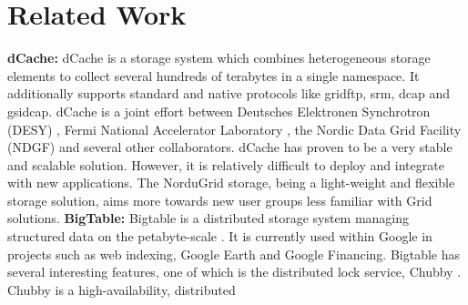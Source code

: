 \documentclass[final]{ieee}
\begin{document}
\section{Related Work}
\label{Related Work}
\textbf{dCache:} dCache is a storage system which combines heterogeneous storage
elements to collect several hundreds of terabytes in a single
namespace. It additionally supports standard and native
protocols like gridftp, srm, dcap and gsidcap. dCache is
a joint effort between Deutsches Elektronen Synchrotron (DESY) \cite{dCachesite}, Fermi National Accelerator Laboratory \cite{FermiLab}, the  Nordic Data
Grid Facility (NDGF) \cite{NDGF}  and several other collaborators. %
dCache has proven to be a very stable and scalable solution. However,
it is relatively difficult to deploy and integrate with new applications. 
The NorduGrid storage, being a light-weight and flexible
storage solution, aims more towards new user groups less familiar with
Grid solutions. 
\newline
\textbf{BigTable:} Bigtable is a distributed storage system managing structured data on
the petabyte-scale \cite{Bigtable}. It is currently used within
Google in projects such as web indexing, Google Earth and Google
Financing. %
Bigtable has several interesting features, one of which is the
distributed lock service, Chubby \cite{Chubby}. Chubby is a high-availability, distributed
\end{document}
